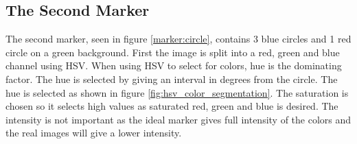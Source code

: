 \subsection{The Second Marker}
The second marker, seen in figure \ref{marker:circle}, contains 3 blue circles and 1 red circle on a green background.
First the image is split into a red, green and blue channel using HSV.
When using HSV to select for colors, hue is the dominating factor.
The hue is selected by giving an interval in degrees from the circle.
The hue is selected as shown in figure \ref{fig:hsv_color_segmentation}.
The saturation is chosen so it selects high values as saturated red, green and blue is desired.
The intensity is not important as the ideal marker gives full intensity of the colors and the real images will give a lower intensity.

\begin{figure}[h]
\centering
\def\scalingFactor{0.4}
%
%
\end{figure}

